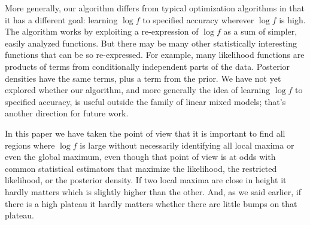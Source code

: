 \documentclass[ejs]{imsart}
\newcommand{\RL}{f}
\newcommand{\logRL}{\log\RL}
\begin{document}
More generally, our algorithm differs from typical optimization algorithms in that it has a different goal: learning $\logRL$ to specified accuracy wherever $\logRL$ is high.  The algorithm works by exploiting a re-expression of $\logRL$ as a sum of simpler, easily analyzed functions.  But there may be many other statistically interesting functions that can be so re-expressed.  For example, many likelihood functions are products of terms from conditionally independent parts of the data.  Posterior densities have the same terms, plus a term from the prior.  We have not yet explored whether our algorithm, and more generally the idea of learning $\logRL$ to specified accuracy, is useful outside the family of linear mixed models; that's another direction for future work.

In this paper we have taken the point of view that it is important to find all regions where $\log f$ is large without necessarily identifying all local maxima or even the global maximum, even though that point of view is at odds with common statistical estimators that maximize the likelihood, the restricted likelihood, or the posterior density.  If two local maxima are close in height it hardly matters which is slightly higher than the other.  And, as we said earlier, if there is a high plateau it hardly matters whether there are little bumps on that plateau.

\appendix
\end{document}

